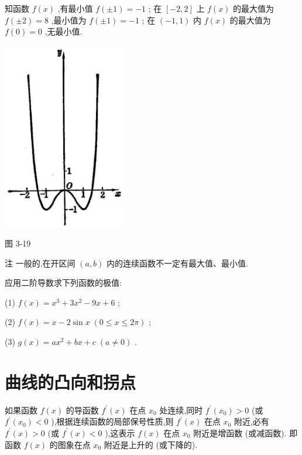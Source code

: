 \documentclass[lang=cn,newtx,10pt,scheme=chinese]{elegantbook}
\begin{document}
知函数 \(f\left( x\right)\) ,有最小值 \(f\left( {\pm 1}\right) = - 1\) ; 在 \(\left\lbrack {-2,2}\right\rbrack\) 上 \(f\left( x\right)\) 的最大值为 \(f\left( {\pm 2}\right) = 8\) ,最小值为 \(f\left( {\pm 1}\right) = - 1\) ; 在 \(\left( {-1,1}\right)\) 内 \(f\left( x\right)\) 的最大值为 \(f\left( 0\right) = 0\) ,无最小值.

\begin{center}
\includegraphics[max width=0.4\textwidth]{images/01912c18-5c3f-733d-b775-749ba9897a9d_164_907490.jpg}
\end{center}

图 3-19

注 一般的,在开区间 \(\left( {a,b}\right)\) 内的连续函数不一定有最大值、最小值.

\begin{problemset}[练习]

\item 应用二阶导数求下列函数的极值:

(1) \(f\left( x\right) = {x}^{3} + 3{x}^{2} - {9x} + 6\) ;

(2) \(f\left( x\right) = x - 2\sin x\;\left( {0 \leq x \leq {2\pi }}\right)\) ;

(3) \(g\left( x\right) = a{x}^{2} + {bx} + c\;\left( {a \neq 0}\right)\) .

\end{problemset}

\section{曲线的凸向和拐点}

如果函数 \(f\left( x\right)\) 的导函数 \({f}^{\prime }\left( x\right)\) 在点 \({x}_{0}\) 处连续,同时 \({f}^{\prime }\left( {x}_{0}\right) > 0\) (或 \({f}^{\prime }\left( {x}_{0}\right) < 0\) ),根据连续函数的局部保号性质,则 \({f}^{\prime }\left( x\right)\) 在点 \({x}_{0}\) 附近,必有 \({f}^{\prime }\left( x\right) > 0\) (或 \({f}^{\prime }\left( x\right) < 0\) ),这表示 \(f\left( x\right)\) 在点 \({x}_{0}\) 附近是增函数 (或减函数). 即函数 \(f\left( x\right)\) 的图象在点 \({x}_{0}\) 附近是上升的 (或下降的).
\end{document}
